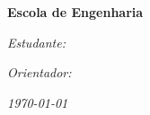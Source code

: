\begin{center}
\textbf{\large{}Escola de Engenharia}
\par\end{center}{\large \par}

\vspace{6cm}

\begin{center}
{\LARGE{}\reporttitle}
\par\end{center}{\LARGE \par}

\vfill{}

%

\textit{\emph{\large{}Estudante: \studentname}}{\large \par}

\textit{\emph{\large{}Orientador: \advisorname}}{\large \par}


%
\vspace{1cm}

%
\begin{flushright}
\textit{\emph{\today}}
\par\end{flushright}

%
\pagebreak{}%

